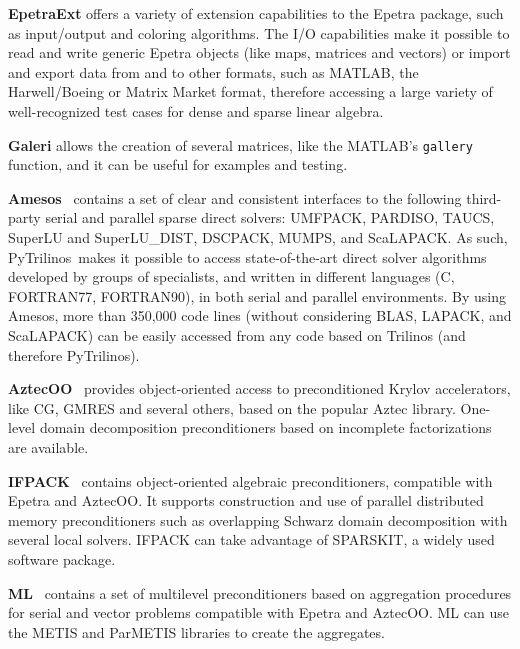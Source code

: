 \documentclass{llncs}
\newcommand{\PyTrilinos}{{\sc PyTrilinos}}
\begin{document}
\noindent
{\bf EpetraExt} offers a variety of extension capabilities to
  the Epetra package, such as input/output and coloring algorithms.
  The I/O capabilities make it possible to read and write generic
  Epetra objects (like maps, matrices and vectors) or import and
  export data from and to other formats, such as MATLAB, the
  Harwell/Boeing or Matrix Market format, therefore
  accessing a large variety of well-recognized test cases for dense
  and sparse linear algebra.

\smallskip

\noindent
{\bf Galeri} allows the creation of several matrices, like the
  MATLAB's {\tt gallery} function, and it can be useful for examples
  and testing.

\smallskip

\noindent
{\bf Amesos}~\cite{Amesos-Reference-Guide} contains a set of clear and consistent interfaces
  to the following third-party serial and parallel sparse direct
  solvers: UMFPACK,
  PARDISO, TAUCS, SuperLU
  and SuperLU\_DIST,
  DSCPACK, MUMPS, and
  ScaLAPACK.  As such,
  \PyTrilinos\ makes it possible to access state-of-the-art direct
  solver algorithms developed by groups of specialists, and written in
  different languages (C, FORTRAN77, FORTRAN90), in both serial and
  parallel environments.  By using Amesos, more than 350,000 code
  lines (without considering BLAS, LAPACK, and ScaLAPACK) can be
  easily accessed from any code based on Trilinos (and therefore
  \PyTrilinos).

\smallskip

\noindent
{\bf AztecOO}~\cite{Aztec} provides object-oriented access to
preconditioned Krylov accelerators, like CG, GMRES and several others, based
on the popular Aztec library.  One-level domain decomposition preconditioners
based on incomplete factorizations are available.

\smallskip

\noindent
{\bf IFPACK}~\cite{ifpack-guide} contains object-oriented algebraic preconditioners,
  compatible with Epetra and AztecOO.  It supports construction and
  use of parallel distributed memory preconditioners such as
  overlapping Schwarz domain decomposition with several local solvers.
  IFPACK can take advantage of SPARSKIT, a widely used
  software package.

\smallskip

\noindent
{\bf ML}~\cite{ml-guide} contains a set of multilevel preconditioners based on
  aggregation procedures for serial and vector problems compatible
  with Epetra and AztecOO.  ML can use the METIS and
  ParMETIS libraries to create the aggregates.
\end{document}
